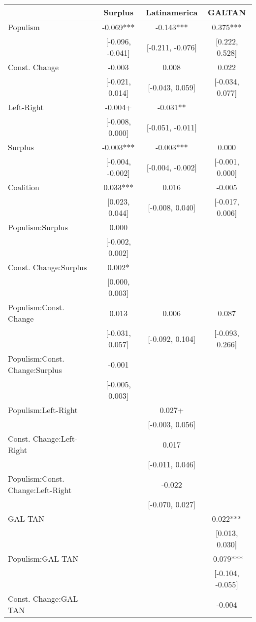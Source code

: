 \begin{table}
\centering\centering\centering
\begin{tabular}[t]{lccc}
\toprule
  & Surplus & Latinamerica & GALTAN\\
\midrule
Populism & -0.069*** & -0.143*** & 0.375***\\
 & {}[-0.096, -0.041] & {}[-0.211, -0.076] & {}[0.222, 0.528]\\
Const. Change & -0.003 & 0.008 & 0.022\\
 & {}[-0.021, 0.014] & {}[-0.043, 0.059] & {}[-0.034, 0.077]\\
Left-Right & -0.004+ & -0.031** & \\
 & {}[-0.008, 0.000] & {}[-0.051, -0.011] & \\
Surplus & -0.003*** & -0.003*** & 0.000\\
 & {}[-0.004, -0.002] & {}[-0.004, -0.002] & {}[-0.001, 0.000]\\
Coalition & 0.033*** & 0.016 & -0.005\\
 & {}[0.023, 0.044] & {}[-0.008, 0.040] & {}[-0.017, 0.006]\\
Populism:Surplus & 0.000 &  & \\
 & {}[-0.002, 0.002] &  & \\
Const. Change:Surplus & 0.002* &  & \\
 & {}[0.000, 0.003] &  & \\
Populism:Const. Change & 0.013 & 0.006 & 0.087\\
 & {}[-0.031, 0.057] & {}[-0.092, 0.104] & {}[-0.093, 0.266]\\
Populism:Const. Change:Surplus & -0.001 &  & \\
 & {}[-0.005, 0.003] &  & \\
Populism:Left-Right &  & 0.027+ & \\
 &  & {}[-0.003, 0.056] & \\
Const. Change:Left-Right &  & 0.017 & \\
 &  & {}[-0.011, 0.046] & \\
Populism:Const. Change:Left-Right &  & -0.022 & \\
 &  & {}[-0.070, 0.027] & \\
GAL-TAN &  &  & 0.022***\\
 &  &  & {}[0.013, 0.030]\\
Populism:GAL-TAN &  &  & -0.079***\\
 &  &  & {}[-0.104, -0.055]\\
Const. Change:GAL-TAN &  &  & -0.004\\

\end{tabular}
\end{table}
